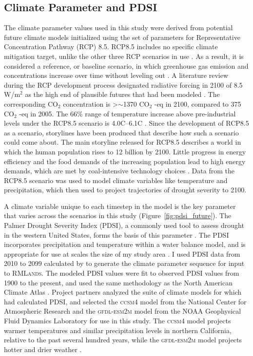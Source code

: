 \subsection{Climate Parameter and PDSI}

The climate parameter values used in this study were derived from potential future climate models initialized using the set of parameters for Representative Concentration Pathway (RCP) 8.5. RCP8.5 includes no specific climate mitigation target, unlike the other three RCP scenarios in use \citep{Riahi2011}. As a result, it is considered a reference, or baseline scenario, in which greenhouse gas emission and concentrations increase over time without leveling out \citep{Riahi2011}. A literature review during the RCP development process designated radiative forcing in 2100 of 8.5 W/m$^2$ as the high end of plausible futures that had been modeled \citep{VanVuuren2011}. The corresponding $\text{CO}_2$ concentration is \textgreater $\sim$1370 $\text{CO}_2$ -eq in 2100, compared to 375 $\text{CO}_2$ -eq in 2005. The 66\% range of temperature increase above pre-industrial levels under the RCP8.5 scenario is 4.0\textdegree C--6.1\textdegree C \citep{Rogelj2012}. Since the development of RCP8.5 as a scenario, storylines have been produced that describe how such a scenario could come about. The main storyline released for RCP8.5 describes a world in which the human population rises to 12 billion by 2100. Little progress in energy efficiency and the food demands of the increasing population lead to high energy demands, which are met by coal-intensive technology choices \citep{Riahi2011}. Data from the RCP8.5 scenario was used to model climate variables like temperature and precipitation, which \citet{Cook2014} then used to project trajectories of drought severity to 2100.

A climate variable unique to each timestep in the model is the key parameter that varies across the scenarios in this study (Figure~\ref{fig:pdsi_future}). The Palmer Drought Severity Index (PDSI), a commonly used tool to assess drought in the western United States, forms the basis of this parameter \citep{Cooketal2004,Cook2004}. The PDSI incorporates precipitation and temperature within a water balance model, and is appropriate for use at scales the size of my study area \citep{HeimJr2002}. I used PDSI data from 2010 to 2099 calculated by \citet{Cook2014} to generate the climate parameter sequence for input to \textsc{RMLands}. The \citet{Cook2014} modeled PDSI values were fit to observed PDSI values from 1900 to the present, and used the same methodology as the North American Climate Atlas \citep{Cook2004}. Project partners analyzed the suite of climate models for which \citet{Cook2014} had calculated PDSI, and selected the \textsc{ccsm4} model from the National Center for Atmospheric Research and the \textsc{gfdl-esm2m} model from the NOAA Geophysical Fluid Dynamics Laboratory for use in this study. The \textsc{ccsm4} model projects warmer temperatures and similar precipitation levels in northern California, relative to the past several hundred years, while the \textsc{gfdl-esm2m} model projects hotter and drier weather \citep{Weiss2013}.

